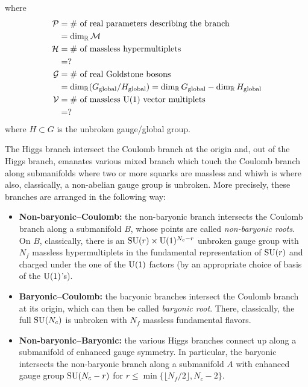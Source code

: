         where
        \begin{align*}
            \mathcal{P} &= \text{\# of real parameters describing the branch} \\
            &= \dim_{\mathbb{R}}\mathcal{M} \\
            \mathcal{H} &= \text{\# of massless hypermultiplets} \\
            &= ? \\
            \mathcal{G} &= \text{\# of real Goldstone bosons} \\
            &= \dim_{\mathbb{R}}(G_{\text{global}}/H_{\text{global}}) = \dim_{\mathbb{R}} G_{\text{global}} - \dim_{\mathbb{R}} H_{\text{global}} \\
            \mathcal{V} &= \text{\# of massless $\text{U}(1)$ vector multiplets} \\
            &= ?
        \end{align*}
        where $H\subset G$ is the unbroken gauge/global group.

        The Higgs branch intersect the Coulomb branch at the origin and, out of the Higgs branch, emanates various mixed branch which touch the Coulomb branch along submanifolds where two or more squarks are massless and whiwh is where also, classically, a non-abelian gauge group is unbroken. More precisely, these branches are arranged in the following way:
        \begin{itemize}
            \item \textbf{Non-baryonic--Coulomb:} the non-baryonic branch intersects the Coulomb branch along a submanifold $B$, whose points are called \emph{non-baryonic roots}. On $B$, classically, there is an $\text{SU}(r)\times\text{U}(1)^{N_c-r}$ unbroken gauge group with $N_f$ massless hypermultiplets in the fundamental representation of $\text{SU}(r)$ and charged under the one of the $\text{U}(1)$ factors (by an appropriate choice of basis of the $\text{U}(1)$'s).
            \item \textbf{Baryonic--Coulomb:} the baryonic branches intersect the Coulomb branch at its origin, which can then be called \emph{baryonic root}. There, classically, the full $\text{SU}(N_c)$ is unbroken with $N_f$ massless fundamental flavors.
            \item \textbf{Non-baryonic--Baryonic:} the various Higgs branches connect up along a submanifold of enhanced gauge symmetry. In particular, the baryonic intersects the non-baryonic branch along a submanifold $A$ with enhanced gauge group $\text{SU}(N_c-r)$ for $r\leq \min\{\lfloor N_f/2\rfloor,N_c-2\}$.
        \end{itemize}
        
